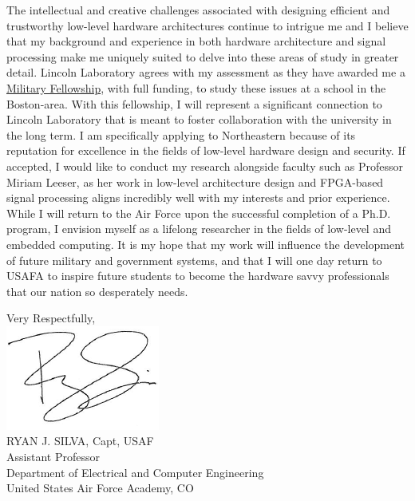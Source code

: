 \documentclass{article}
\begin{document}
The intellectual and creative challenges associated with designing efficient
 and trustworthy low-level hardware architectures continue to intrigue me and I believe that my
background and experience in both hardware architecture and signal processing make
me uniquely suited to delve into these areas of study in greater detail.
Lincoln Laboratory agrees with my assessment as they have awarded me a
\href{http://www.ll.mit.edu/college/fellowsprograms.html}{Military Fellowship},
with full funding, to study these issues at a school in the Boston-area. With
this fellowship, I will represent a significant connection to Lincoln
Laboratory that is meant to foster collaboration with the university in the long term. I am
specifically applying to Northeastern because of its reputation for excellence in
the fields of low-level hardware design and security. If accepted, I would like
to conduct my research alongside faculty such as Professor Miriam Leeser, as
her work in low-level architecture
design and FPGA-based signal processing aligns incredibly well with my
interests and prior experience. While I
will return to the Air Force upon the successful completion of a Ph.D. program,
I envision myself as a lifelong researcher in the fields of low-level and
embedded computing. It is my hope that my work will influence the development
of future military and government systems, and that I will one day return to
USAFA to inspire future students to become the hardware savvy professionals
that our nation so desperately needs.

\vspace{2mm}
\hspace*{2.3in} \noindent Very Respectfully, \\
\hspace*{2.5in} \includegraphics[scale=.5]{silvasig}  \\
\hspace*{2.5in} RYAN J. SILVA, Capt, USAF \\
\hspace*{2.5in} Assistant Professor   \\
\hspace*{2.5in} Department of Electrical and Computer Engineering  \\
\hspace*{2.5in} United States Air Force Academy, CO  
\end{document}
